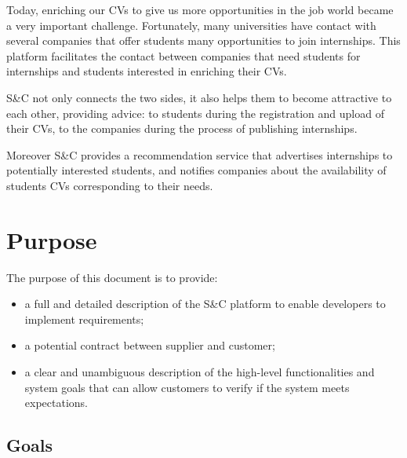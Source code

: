 Today, enriching our CVs to give us more opportunities in the job world became a very important challenge. 
Fortunately, many universities have contact with several companies that offer students many opportunities to join internships.
This platform facilitates the contact between companies that need students for internships and students interested in enriching their CVs.

S\&C not only connects the two sides, it also helps them to become attractive to each other, providing advice: to students during the registration and upload of their CVs, to the companies during the process of publishing internships.

Moreover S\&C provides a recommendation service that advertises internships to potentially interested students, and notifies companies about the availability of students CVs corresponding to their needs.

\newpage

\section{Purpose}
\label{sec:purpose}%
The purpose of this document is to provide:
\begin{itemize}
    \item a full and detailed description of the S\&C platform to enable developers to                   implement requirements;
    \item a potential contract between supplier and customer;
    \item a clear and unambiguous description of the high-level functionalities and                   system goals that can allow customers to verify if the system meets                               expectations.
\end{itemize}


\subsection{Goals}
\label{subsec:goals}%
\setcounter{g}{1}
\newcommand{\cg}{\theg\stepcounter{g}}

